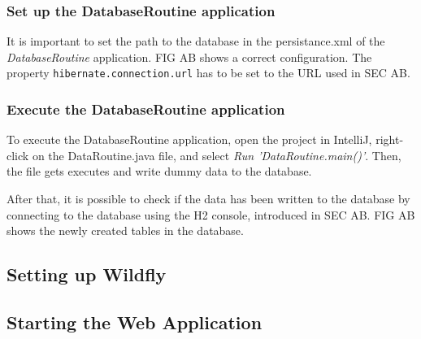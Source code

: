 \subsubsection{Set up the DatabaseRoutine application}
It is important to set the path to the database in the persistance.xml of the \textit{DatabaseRoutine} application. FIG AB shows a correct configuration. The property \texttt{hibernate.connection.url} has to be set to the URL used in SEC AB.

\subsubsection{Execute the DatabaseRoutine application}
To execute the DatabaseRoutine application, open the project in IntelliJ, right-click on the DataRoutine.java file, and select \textit{Run 'DataRoutine.main()'}. Then, the file gets executes and write dummy data to the database.

After that, it is possible to check if the data has been written to the database by connecting to the database using the H2 console, introduced in SEC AB. FIG AB shows the newly created tables in the database.



\subsection{Setting up Wildfly}


\subsection{Starting the Web Application}
